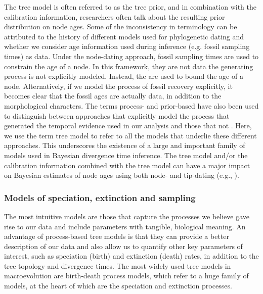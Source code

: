 The tree model is often referred to as the tree prior, and in combination with the calibration information, researchers often talk about the resulting prior distribution on node ages.
Some of the inconsistency in terminology can be attributed to the history of different models used for phylogenetic dating and whether we consider age information used during inference (e.g. fossil sampling times) as data.
Under the node-dating approach, fossil sampling times are used to constrain the age of a node.
In this framework, they are not data  the generating process is not explicitly modeled. 
Instead, the  are used to bound the age of a node.
Alternatively, if we model the process of fossil recovery explicitly, it becomes clear that the fossil ages are actually data, in addition to the morphological characters.
The terms process- and prior-based have also been used to distinguish between approaches that explicitly model the  process that generated the temporal evidence used in our analysis and those that  not \citep{Landis2016}. 
Here, we use the term tree model to refer to all the models that underlie these different approaches.
 This underscores the existence of a large and important family of models used in Bayesian divergence time inference.
The tree model and/or the calibration information combined with the tree model can have a major impact on Bayesian estimates of node ages using both node- and tip-dating (e.g., \citep{Ho2009,Warnock2011,OReilly2015,matzke2016,Matschiner2017}).

\subsubsection{Models of speciation, extinction and sampling}

The most intuitive models are those that capture the processes we believe gave rise to our data and include parameters with tangible, biological meaning.
An advantage of process-based tree models is that they can provide a better description of our data and also allow us to quantify other key parameters of interest, such as speciation (birth) and extinction (death) rates, in addition to the tree topology and divergence times.
The most widely used tree models in macroevolution are birth-death process models, which refer to a huge family of models, at the heart of which are the speciation and extinction processes. 

